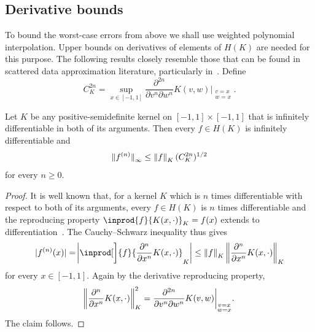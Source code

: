 \documentclass{mcom-l}
\numberwithin{equation}{section}
\numberwithin{theorem}{section} %
\begin{document}
\subsection{Derivative bounds}

To bound the worst-case errors from above we shall use weighted polynomial interpolation.
Upper bounds on derivatives of elements of $H(K)$ are needed for this purpose.
The following results closely resemble those that can be found in scattered data approximation literature, particularly in~\cite{Zwicknagl2009}.
Define
\begin{equation} \label{eq:CK2n-definition}
  C_K^{2n} = \sup_{x \in [-1, 1]} \frac{\partial^{2n}}{\partial v^n \partial w^n} K(v, w) \biggl|_{\substack{v = x \\ w = x}}.
\end{equation}

\begin{lemma} \label{lemma:rkhs-norm-derivative}
  Let $K$ be any positive-semidefinite kernel on $[-1, 1] \times [-1, 1]$ that is infinitely differentiable in both of its arguments.
  Then every $f \in H(K)$ is infinitely differentiable and
  \begin{equation*}
    \norm[0]{f^{(n)}}_\infty \leq \norm[0]{f}_K (C_K^{2n})^{1/2}
  \end{equation*}
  for every $n \geq 0$.
\end{lemma}
\begin{proof}
  It is well known that, for a kernel $K$ which is $n$ times differentiable with respect to both of its arguments, every $f \in H(K)$ is $n$ times differentiable and the reproducing property $\inprod{f}{K(x, \cdot)}_K = f(x)$ extends to differentiation~\cite[Cor.\@~4.36]{Steinwart2008}.
  The Cauchy--Schwarz inequality thus gives
  \begin{equation*}
    \abs[0]{f^{(n)}(x)} = \abs[3]{ \inprod[\bigg]{f}{\frac{\partial^n}{\partial x^n} K(x, \cdot)}_K } \leq \norm[0]{f}_K \, \norm[3]{ \frac{\partial^n}{\partial x^n} K(x, \cdot)}_K
  \end{equation*}
  for every $x \in [-1, 1]$.
  Again by the derivative reproducing property,
  \begin{equation*}
    \norm[3]{ \frac{\partial^n}{\partial x^n} K(x, \cdot)}_K^2 = \frac{\partial^{2n}}{\partial v^n \partial w^n} K(v, w) \biggl|_{\substack{v = x \\ w = x}}.
  \end{equation*}
  The claim follows.
\end{proof}
\end{document}
